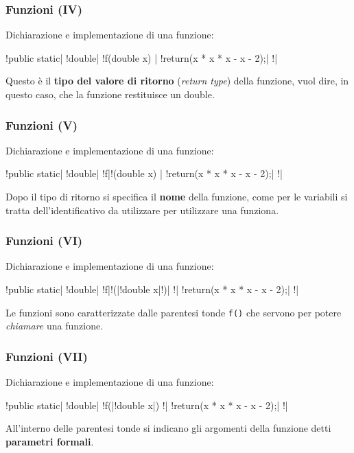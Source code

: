 \begin{frame}[fragile]\frametitle{Funzioni (IV)}

  Dichiarazione e implementazione di una funzione:
  
  \begin{JavaCodePlain}[commandchars=\\!|]
  \Grey!public static| \Red!double| \Grey!f(double x) {|
      \Grey!return(x * x * x - x - 2);|
  \Grey!}|
  \end{JavaCodePlain}
  
  Questo è il \textbf{tipo del valore di ritorno} (\emph{return type})
  della funzione, vuol dire, in questo caso, che la funzione restituisce
  un double.

\end{frame}

\begin{frame}[fragile]\frametitle{Funzioni (V)}

  Dichiarazione e implementazione di una funzione:

  \begin{JavaCodePlain}[commandchars=\\!|]
  \Grey!public static| \Grey!double| \Red!f|\Grey!(double x) {|
      \Grey!return(x * x * x - x - 2);|
  \Grey!}|
  \end{JavaCodePlain}
  
  Dopo il tipo di ritorno si specifica il \textbf{nome} della funzione,
  come per le variabili si tratta dell'identificativo da utilizzare per
  utilizzare una funziona.

\end{frame}

\begin{frame}[fragile]\frametitle{Funzioni (VI)}

  Dichiarazione e implementazione di una funzione:

  \begin{JavaCodePlain}[commandchars=\\!|]
  \Grey!public static| \Grey!double| \Grey!f|\Red!(|\Grey!double x|\Red!)| \Grey!{|
      \Grey!return(x * x * x - x - 2);|
  \Grey!}|
  \end{JavaCodePlain}

  Le funzioni sono caratterizzate dalle parentesi tonde \texttt{f()} che servono
  per potere \emph{chiamare} una funzione.

\end{frame}

\begin{frame}[fragile]\frametitle{Funzioni (VII)}

  Dichiarazione e implementazione di una funzione:

  \begin{JavaCodePlain}[commandchars=\\!|]
  \Grey!public static| \Grey!double| \Grey!f(|\Red!double x|) \Grey!{|
      \Grey!return(x * x * x - x - 2);|
  \Grey!}|
  \end{JavaCodePlain}

  All'interno delle parentesi tonde si indicano gli argomenti della
  funzione detti \textbf{parametri formali}.

\end{frame}

